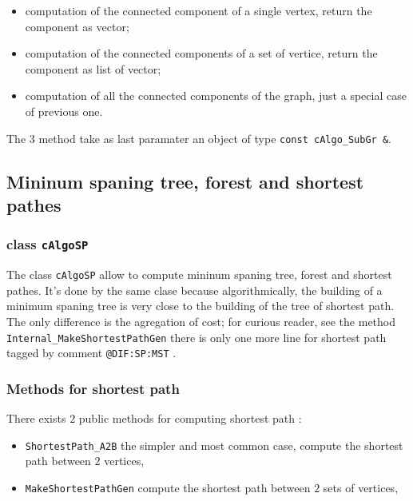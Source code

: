 \begin{itemize}
    \item computation of the connected component of a single vertex, return the component as vector;

    \item computation of the connected components of a set of vertice, return the component as list of vector;

    \item computation of all the connected components of the graph, just a special case of previous one.
\end{itemize}

The $3$ method take as last paramater an object of type {\tt const cAlgo\_SubGr \&}.



\subsection{Mininum spaning tree, forest and shortest pathes}

\subsubsection{class {\tt cAlgoSP}}

The class {\tt cAlgoSP} allow to compute mininum spaning tree, forest and shortest pathes.
It's done by the same clase because algorithmically, the building of a minimum spaning tree
is very close to the building of the tree of shortest path. 
The only difference is the agregation of cost; for curious reader, see the
method {\tt Internal\_MakeShortestPathGen} there is only one more line for
shortest path tagged by comment {\tt  @DIF:SP:MST} .


\subsubsection{Methods for shortest path}

There  exists  $2$ public methods for computing shortest path :

\begin{itemize}
    \item {\tt ShortestPath\_A2B} the simpler and most common case,
          compute the shortest path between $2$ vertices,

    \item {\tt MakeShortestPathGen} compute the shortest path between $2$ sets of vertices,
\end{itemize}



